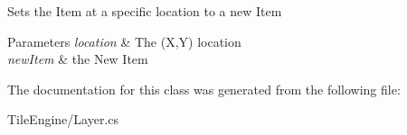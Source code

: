 Sets the Item at a specific location to a new Item 


\begin{DoxyParams}{Parameters}
{\em location} & The (X,Y) location\\
\hline
{\em new\-Item} & the New Item\\
\hline
\end{DoxyParams}


The documentation for this class was generated from the following file\-:\begin{DoxyCompactItemize}
\item 
Tile\-Engine/Layer.\-cs\end{DoxyCompactItemize}
